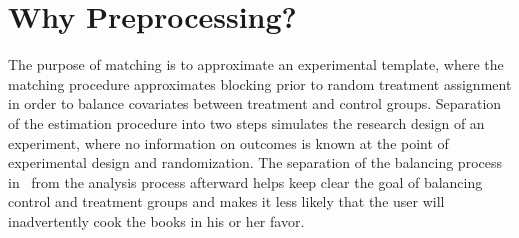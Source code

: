 \section{Why Preprocessing?}

The purpose of matching is to approximate an experimental template,
where the matching procedure approximates blocking prior to random
treatment assignment in order to balance covariates between treatment
and control groups.  Separation of the estimation procedure into two
steps simulates the research design of an experiment, where no
information on outcomes is known at the point of experimental design
and randomization.  The separation of the balancing process in
\MatchIt\ from the analysis process afterward helps keep clear the
goal of balancing control and treatment groups and makes it less
likely that the user will inadvertently cook the books in his or her
favor.


